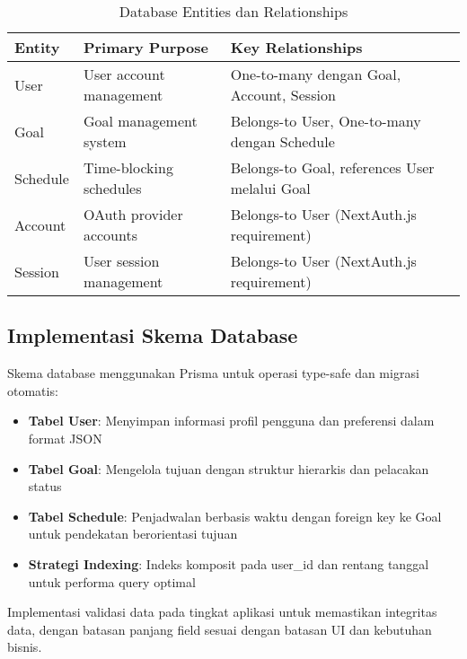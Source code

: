 \begin{table}[ht]
\centering
\caption{Database Entities dan Relationships}
\label{tab:database-entities}
\footnotesize
\begin{adjustbox}{width=\textwidth,center}
\begin{tabular}{@{}p{2.5cm}p{4cm}p{6cm}@{}}
\toprule
\textbf{Entity} & \textbf{Primary Purpose} & \textbf{Key Relationships} \\
\midrule
User & User account management & One-to-many dengan Goal, Account, Session \\
\hline
Goal & Goal management system & Belongs-to User, One-to-many dengan Schedule \\
\hline
Schedule & Time-blocking schedules & Belongs-to Goal, references User melalui Goal \\
\hline
Account & OAuth provider accounts & Belongs-to User (NextAuth.js requirement) \\
\hline
Session & User session management & Belongs-to User (NextAuth.js requirement) \\
\bottomrule
\end{tabular}
\end{adjustbox}
\end{table}

\subsection{Implementasi Skema Database}

Skema database menggunakan Prisma untuk operasi type-safe dan migrasi otomatis:

\begin{itemize}
\item \textbf{Tabel User}: Menyimpan informasi profil pengguna dan preferensi dalam format JSON
\item \textbf{Tabel Goal}: Mengelola tujuan dengan struktur hierarkis dan pelacakan status
\item \textbf{Tabel Schedule}: Penjadwalan berbasis waktu dengan foreign key ke Goal untuk pendekatan berorientasi tujuan
\item \textbf{Strategi Indexing}: Indeks komposit pada user\_id dan rentang tanggal untuk performa query optimal
\end{itemize}

Implementasi validasi data pada tingkat aplikasi untuk memastikan integritas data, dengan batasan panjang field sesuai dengan batasan UI dan kebutuhan bisnis.

